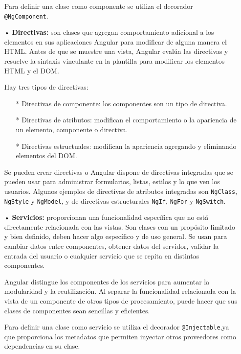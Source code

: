 \documentclass[a4paper, 12pt]{book}
\begin{document}
\begin{itemize}
	Para definir una clase como componente se utiliza el decorador \texttt{@NgComponent}.
	
	\item[•] \textbf{Directivas:} son clases que agregan comportamiento adicional a los elementos en sus aplicaciones Angular para modificar de alguna manera el HTML. 
	Antes de que se muestre una vista, Angular evalúa las directivas y resuelve la sintaxis vinculante en la plantilla para modificar los elementos HTML y el DOM.
	
	Hay tres tipos de directivas:
	
	\begin{itemize}
	\item[*] Directivas de componente: los componentes son un tipo de directiva.
	\item[*] Directivas de atributos: modifican el comportamiento o la apariencia de un elemento, componente o directiva.
	\item[*] Directivas estructuales: modifican la apariencia agregando y eliminando elementos del DOM.
	\end{itemize}
	
	Se pueden crear directivas o Angular dispone de directivas integradas que se pueden usar para administrar formularios, listas, estilos y lo que ven los usuarios. 
	Algunos ejemplos de directivas de atributos integradas son \texttt{NgClass}, \texttt{NgStyle} y \texttt{NgModel}, y de directivas estructurales \texttt{NgIf}, \texttt{NgFor} y \texttt{NgSwitch}.
	
	\item[•] \textbf{Servicios:} proporcionan una funcionalidad específica que no está directamente relacionada con las vistas. Son clases con un propósito limitado y bien definido, deben hacer algo específico y de uso general. 
	Se usan para cambiar datos entre componentes, obtener datos del servidor, validar la entrada del usuario o cualquier servicio que se repita en distintas componentes.
	
	Angular distingue los componentes de los servicios para aumentar la modularidad y la reutilización. 
	Al separar la funcionalidad relacionada con la vista de un componente de otros tipos de procesamiento, puede hacer que sus clases de componentes sean sencillas y eficientes.
	
	Para definir una clase como servicio se utiliza el decorador \texttt{@Injectable},ya que proporciona los metadatos que permiten inyectar otros proveedores como dependencias en su clase.
	
\end{itemize}
\end{document}
